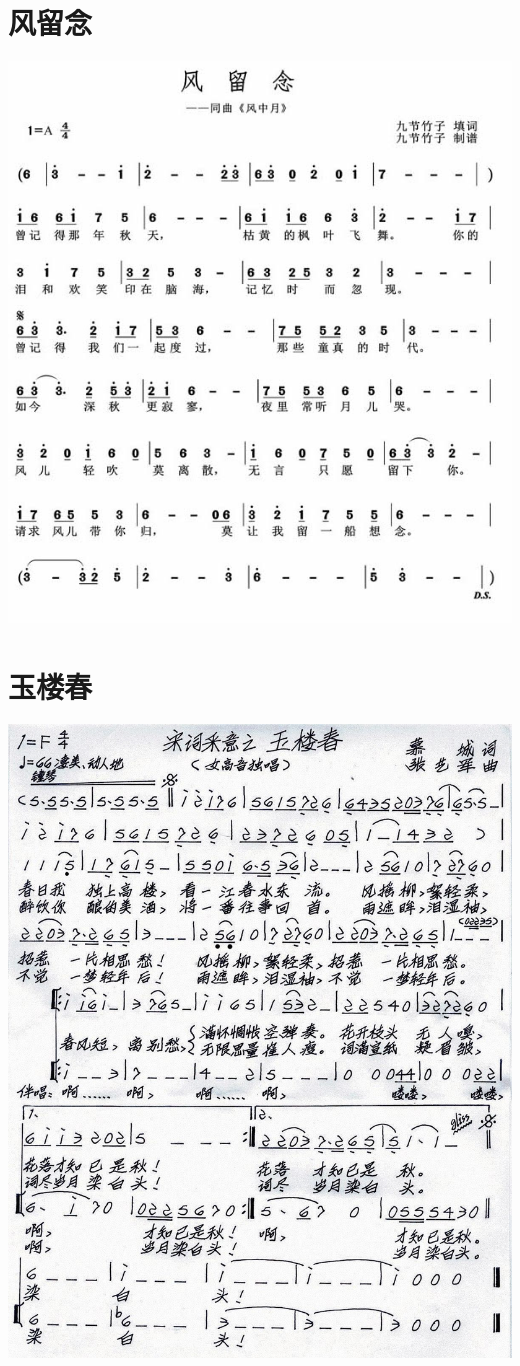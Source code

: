 \documentclass[cn,pad,chinesefont=nofont]{elegantbook}
\begin{document}
\section{风留念}
    \includegraphics[width=\textwidth]{dongxiao/20200323风留念.jpg}
\section{玉楼春}
    \includegraphics[width=\textwidth]{dongxiao/20200323玉楼春.jpg}
\end{document}
